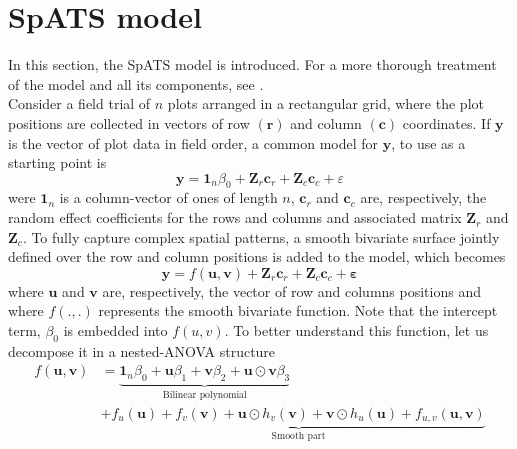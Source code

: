 \section{SpATS model}
In this section, the SpATS model is introduced. For a more thorough treatment of the model and all its components, see \textcite{rodriguez2016spatial}.\\
Consider a field trial of $n$ plots arranged in a rectangular grid, where the plot positions are collected in vectors of row $(\mathbf{r})$ and column $(\mathbf{c})$ coordinates. If $\mathbf{y}$ is the vector of plot data in field order, a common model for $\mathbf{y}$, to use as a starting point is
\begin{equation}
    \boldsymbol{y}=\mathbf{1}_{n} \beta_{0}+\boldsymbol{Z}_{r} \boldsymbol{c}_{r}+\boldsymbol{Z}_{c} \boldsymbol{c}_{c}+\varepsilon
\end{equation}
were $\mathbf{1}_{n}$ is a column-vector of ones of length $n$, $\boldsymbol{c}_{r}$ and $\boldsymbol{c}_{c}$ are, respectively, the random effect coefficients for the rows and columns and associated matrix $\boldsymbol{Z}_{r}$ and $\boldsymbol{Z}_{c}$. To fully capture complex spatial patterns, a smooth bivariate surface jointly defined over the row and column positions is added to the model, which becomes
\begin{equation}
    \boldsymbol{y}=f(\boldsymbol{u}, \boldsymbol{v})+\boldsymbol{Z}_{r} \boldsymbol{c}_{r}+\boldsymbol{Z}_{c} \boldsymbol{c}_{c}+\boldsymbol{\varepsilon}
    \label{eq:base_model_bismooth_surface}
\end{equation}
where $\mathbf{u}$ and $\mathbf{v}$ are, respectively, the vector of row and columns positions and where $f(.,.)$ represents the smooth bivariate function. Note that the intercept term, $\beta_0$ is embedded into $f(u,v)$. To better understand this function, let us decompose it in a nested-ANOVA structure
\begin{align}
f ( \boldsymbol { u } , \boldsymbol { v } ) & = \underbrace { \mathbf { 1 } _ { n } \beta _ { 0 } + \boldsymbol { u } \beta _ { 1 } + \boldsymbol { v } \beta _ { 2 } + \boldsymbol { u } \odot \boldsymbol { v } \beta _ { 3 } } _ { \text { Bilinear polynomial } } \nonumber \\
 & + \underbrace { f _ { u } ( \boldsymbol { u } ) + f _ { v } ( \boldsymbol { v } ) + \boldsymbol { u } \odot h _ { v } ( \boldsymbol { v } ) + \boldsymbol { v } \odot h _ { u } ( \boldsymbol { u } ) + f _ { u , v } ( \boldsymbol { u } , \boldsymbol { v } ) }_{\text{Smooth part}}
 \label{eq:full_bivariate_smooth_surface_model}
\end{align}
